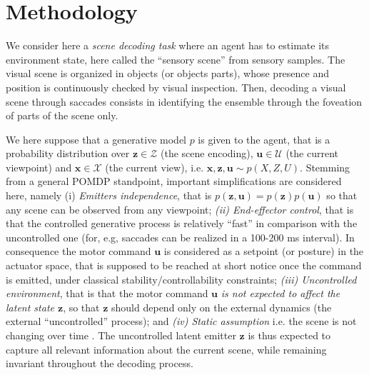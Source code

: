 \documentclass{article}
\begin{document}



\section{Methodology}

We consider here a \emph{scene decoding task} where an agent has to estimate its environment state, here called the ``sensory scene'' from sensory samples. The visual scene is organized in objects (or objects parts), whose presence and position is continuously checked by visual inspection. 
Then, decoding a visual scene through saccades consists in identifying the ensemble through the foveation of parts of the scene only. 

We here suppose that a generative model $p$ is given to the agent, that is a probability distribution over $\boldsymbol{z} \in \mathcal{Z}$ (the scene encoding),  $\boldsymbol{u} \in \mathcal{U}$ (the current viewpoint) and $\boldsymbol{x} \in \mathcal{X}$ (the current view), i.e. $\boldsymbol{x}, \boldsymbol{z}, \boldsymbol{u} \sim p(X,Z,U)$.
Stemming from a general POMDP standpoint, important simplifications are considered here, namely (i) \emph{Emitters independence}, that is $p(\boldsymbol{z}, \boldsymbol{u}) = p(\boldsymbol{z})p(\boldsymbol{u})$ so that
any scene can be observed from any viewpoint; 
\emph{(ii) End-effector control}, 
that is that the controlled generative process is relatively ``fast'' in comparison with the uncontrolled one
(for, e.g, saccades can be realized in a 100-200 ms interval). 
In consequence the motor command  $\boldsymbol{u}$ is considered as a setpoint (or posture) in the actuator space, that is supposed to be reached 
at short notice once the command is emitted, under classical stability/controllability constraints; \emph{(iii) Uncontrolled environment}, that is that the motor command $\boldsymbol{u}$ \emph{is not expected to affect the  latent state $\boldsymbol{z}$},
so that $\boldsymbol{z}$ should depend only on the external dynamics (the external ``uncontrolled'' process); and
\emph{(iv) Static assumption}
i.e. the scene is not changing over time \cite{butko2010infomax}. 
The uncontrolled latent emitter $\boldsymbol{z}$ is thus expected to capture all relevant information about the current scene, while remaining invariant throughout the decoding process.
\end{document}
